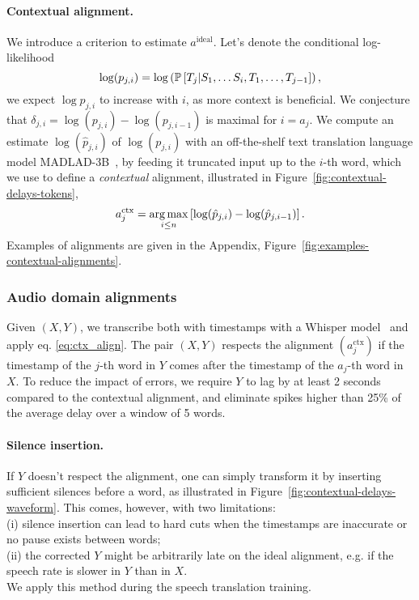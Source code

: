 \paragraph{Contextual alignment.}
We introduce a criterion to estimate $a^{\text{ideal}}$.
Let's denote the conditional log-likelihood
\begin{equation}
    \label{eq:delay_proba_gt}
    \log(p_{j, i}) = \log\left(\mathbb{P}\left[T_j | S_1, \ldots S_{i}, T_{1}, \ldots, T_{j-1} \right]\right),
\end{equation}
we expect $\log p_{j, i}$ to increase with $i$,
as more context is beneficial.
We conjecture that $\delta_{j,i} = \log(p_{j, i}) - \log(p_{j, i - 1})$ is maximal for $i = a_{j}$.
We compute an estimate $\log(\hat{p}_{j, i})$ of 
$\log(p_{j, i})$ with an off-the-shelf 
text translation language model MADLAD-3B~\citep{madlad}, by feeding it
truncated input up to the $i$-th word, which we use to define a \emph{contextual} alignment, illustrated in Figure~\ref{fig:contextual-delays-tokens},
\begin{equation}
\label{eq:ctx_align}
    a^{\text{ctx}}_j = \operatorname*{arg\,max}_{i \leq n}  \left[\log(\hat{p}_{j, i}) - \log(\hat{p}_{j, i - 1}) \right].
\end{equation}
Examples of alignments are given in the Appendix, Figure~\ref{fig:examples-contextual-alignments}.

\subsubsection{Audio domain alignments}
\label{sec:audio-domain-align}

Given $(X, Y)$, we transcribe both with timestamps with 
a Whisper model~\citep{whisper,lintoai2023whispertimestamped}
and apply eq. \eqref{eq:ctx_align}.
The pair $(X, Y)$ respects
the alignment $(a^{\textrm{ctx}}_j)$ if the timestamp of the $j$-th word in $Y$
comes after the timestamp of the $a_j$-th word in $X$. To reduce
the impact of errors, we require $Y$
to lag by at least 2 seconds compared to the contextual alignment, and eliminate spikes higher than 25\% of the average delay over
a window of 5 words.

\paragraph{Silence insertion.}
If $Y$ doesn't respect the alignment,
one can simply transform it by inserting sufficient silences
before a word, as illustrated in Figure~\ref{fig:contextual-delays-waveform}.
This comes, however, with two limitations: \\(i) silence insertion
can lead to hard cuts when the timestamps are inaccurate
or no pause exists between words;\\ (ii) the corrected $Y$ might be arbitrarily
late on the ideal alignment, e.g. if the speech rate is slower in $Y$ than in $X$.\\
We apply this method during the speech translation training.

